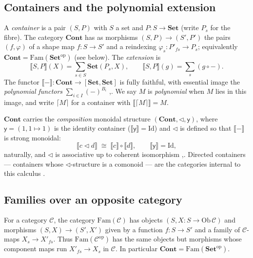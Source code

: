 \documentclass[11pt]{amsart}
\theoremstyle{plain}
\theoremstyle{definition}
\newcommand{\Set}{\mathbf{Set}}
\newcommand{\Cont}{\mathbf{Cont}}
\newcommand{\Fam}{\mathrm{Fam}}
\newcommand{\op}{\mathrm{op}}
\newcommand{\ext}[1]{\llbracket #1 \rrbracket}
\newcommand{\Id}{\mathrm{Id}}
\newcommand{\ceil}[1]{\lceil #1 \rceil}
\newcommand{\y}{\mathsf{y}}
\begin{document}
\subsection{Containers and the polynomial extension}
A \emph{container} is a pair $(S,P)$ with $S$ a set and $P\colon S\to\Set$ (write $P_s$ for the
fibre). The category $\Cont$ has as morphisms $(S,P)\to(S',P')$ the pairs $(f,\varphi)$ of a shape
map $f\colon S\to S'$ and a reindexing $\varphi_s\colon P'_{fs}\to P_s$; equivalently
$\Cont=\Fam(\Set^{\op})$ (see below). The \emph{extension} is
\[
  \ext{S,P}(X)=\sum_{s\in S}\Set(P_s,X),\qquad \ext{S,P}(g)=\textstyle\sum_s(g\circ-).
\]
The functor $\ext{-}\colon\Cont\to[\Set,\Set]$ is fully faithful, with essential image the
\emph{polynomial functors} $\sum_{i\in I}(-)^{B_i}$ \cite[\S1]{GambinoKock},\cite{NiuSpivak}. We say
$M$ is \emph{polynomial} when $M$ lies in this image, and write $\ceil M$ for a container with
$\ext{\ceil M}=M$.

$\Cont$ carries the \emph{composition} monoidal structure $(\Cont,\triangleleft,\y)$, where $\y=(1,
1\mapsto1)$ is the identity container ($\ext{\y}=\Id$) and $\triangleleft$ is defined so that
$\ext{-}$ is strong monoidal:
\begin{equation}\label{eq:AAGmon}
  \ext{c\triangleleft d}\;\cong\;\ext{c}\circ\ext{d},\qquad \ext{\y}=\Id,
\end{equation}
naturally, and $\triangleleft$ is associative up to coherent isomorphism
\cite[Thm.~1.12]{GambinoKock},\cite{NiuSpivak}. Directed containers --- containers whose
$\triangleleft$-structure is a comonoid --- are the categories internal to this calculus
\cite{AhmanUustaluDCC}.

\subsection{Families over an opposite category}
For a category $\mathcal C$, the category $\Fam(\mathcal C)$ has objects $(S,X\colon S\to\mathrm{Ob}\,
\mathcal C)$ and morphisms $(S,X)\to(S',X')$ given by a function $f\colon S\to S'$ and a family of
$\mathcal C$-maps $X_s\to X'_{fs}$. Thus $\Fam(\mathcal C^{\op})$ has the same objects but morphisms
whose component maps run $X'_{fs}\to X_s$ in $\mathcal C$. In particular $\Cont=\Fam(\Set^{\op})$.
\end{document}
